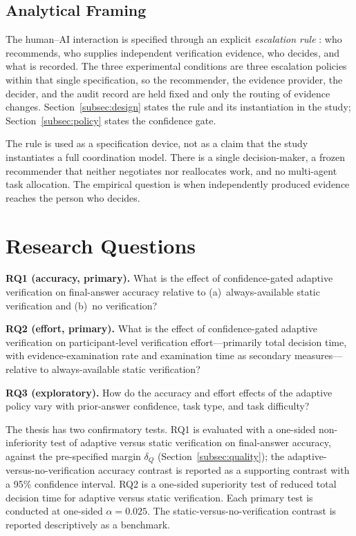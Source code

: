 \documentclass[oneside,final,14pt,a4paper]{extreport}
\begin{document}
\subsection{Analytical Framing}
\label{subsec:framing}

The human--AI interaction is specified through an explicit \emph{escalation
rule} \cite{Ciancarini2027}: who recommends, who supplies independent
verification evidence, who decides, and what is recorded. The three
experimental conditions are three escalation policies within that single
specification, so the recommender, the evidence provider, the decider, and the
audit record are held fixed and only the routing of evidence changes.
Section~\ref{subsec:design} states the rule and its instantiation in the
study; Section~\ref{subsec:policy} states the confidence gate.

The rule is used as a specification device, not as a claim that the study
instantiates a full coordination model. There is a single decision-maker, a
frozen recommender that neither negotiates nor reallocates work, and no
multi-agent task allocation. The empirical question is when independently
produced evidence reaches the person who decides.


\section{Research Questions}


\textbf{RQ1 (accuracy, primary).} What is the effect of confidence-gated
adaptive verification on final-answer accuracy relative to (a)~always-available
static verification and (b)~no verification?

\textbf{RQ2 (effort, primary).} What is the effect of confidence-gated
adaptive verification on participant-level verification effort---primarily
total decision time, with evidence-examination rate and examination time as
secondary measures---relative to always-available static verification?

\textbf{RQ3 (exploratory).} How do the accuracy and effort effects of the
adaptive policy vary with prior-answer confidence, task type, and task
difficulty?

The thesis has two confirmatory tests. RQ1 is evaluated with a one-sided
non-inferiority test of adaptive versus static verification on final-answer
accuracy, against the pre-specified margin $\delta_Q$
(Section~\ref{subsec:quality}); the adaptive-versus-no-verification accuracy
contrast is reported as a supporting contrast with a 95\% confidence interval.
RQ2 is a one-sided superiority test of reduced total decision time for adaptive
versus static verification. Each primary test is conducted at one-sided
$\alpha=0.025$. The static-versus-no-verification contrast is reported
descriptively as a benchmark.
\end{document}
